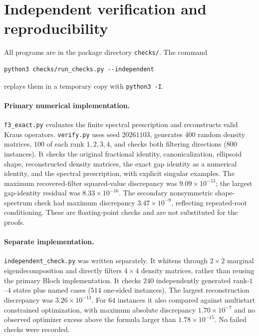\documentclass[11pt]{article}
\theoremstyle{remark}\newtheorem{remark}[theorem]{Remark}
\begin{document}
\section{Independent verification and reproducibility}\label{app:checks}

All programs are in the package directory \texttt{checks/}. The command
\begin{verbatim}
python3 checks/run_checks.py --independent
\end{verbatim}
replays them in a temporary copy with \texttt{python3 -I}.

\paragraph{Primary numerical implementation.}
\texttt{f3\_exact.py} evaluates the finite spectral prescription and
reconstructs valid Kraus operators. \texttt{verify.py} uses seed
$20261103$, generates $400$ random density matrices, $100$ of each rank
$1,2,3,4$, and checks both filtering directions ($800$ instances).
It checks the original fractional identity, canonicalization, ellipsoid
shape, reconstructed density matrices, the exact gap identity as a numerical
identity, and the spectral prescription, with explicit singular examples.
The maximum recovered-filter squared-value discrepancy was
$9.09\times10^{-13}$; the largest gap-identity residual was
$8.33\times10^{-16}$. The secondary nonsymmetric shape-spectrum check had
maximum discrepancy $3.47\times10^{-9}$, reflecting repeated-root
conditioning. These are floating-point checks and are not substituted for
the proofs.

\paragraph{Separate implementation.}
\texttt{independent\_check.py} was written separately. It whitens through
$2\times2$ marginal eigendecomposition and directly filters $4\times4$
density matrices, rather than reusing the primary Bloch implementation.
It checks $240$ independently generated rank-$1$--$4$ states plus named
cases ($514$ one-sided instances). The largest reconstruction discrepancy
was $3.26\times10^{-13}$. For $64$ instances it also compared against
multistart constrained optimization, with maximum absolute discrepancy
$1.70\times10^{-7}$ and no observed optimizer excess above the formula
larger than $1.78\times10^{-15}$. No failed checks were recorded.
\end{document}
